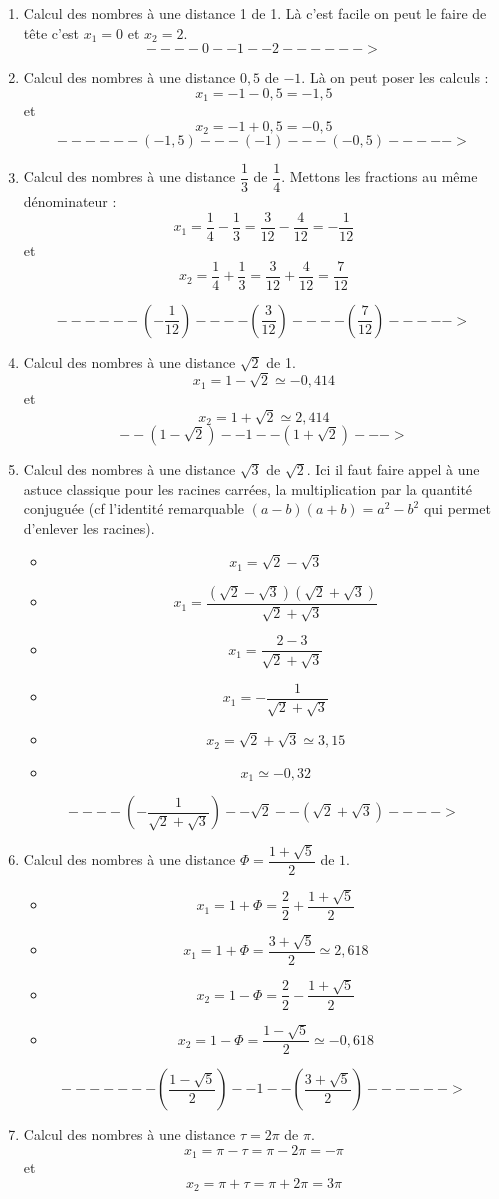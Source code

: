 \documentclass[a4paper,11pt]{book}
\begin{document}
\begin{enumerate}
\item Calcul des nombres à une distance 1 de 1. Là c'est facile on peut
le faire de tête c'est \(x_1 = 0\) et \(x_2 = 2\).
\[----0--1--2------>\]
\item Calcul des nombres à une distance \(0,5\) de \(-1\). Là on peut
poser les calculs :
\[x_1 = -1 - 0,5 = -1,5\]
et
\[x_2 = -1 + 0,5 = -0,5\]
\[------(-1,5)---(-1)---(-0,5)----->\]
\item Calcul des nombres à une distance \(\dfrac{1}{3}\) de
\(\dfrac{1}{4}\). Mettons les fractions au même dénominateur :
\[x_1 = \dfrac{1}{4} - \dfrac{1}{3} = \dfrac{3}{12} - \dfrac{4}{12} =
   -\dfrac{1}{12}\]
et
\[x_2 = \dfrac{1}{4} + \dfrac{1}{3} = \dfrac{3}{12} + \dfrac{4}{12}
   = \dfrac{7}{12}\]

\[------\left(-\dfrac{1}{12}\right)----\left(\dfrac{3}{12}\right)----\left(\dfrac{7}{12}\right)----->\]
\item Calcul des nombres à une distance \(\sqrt{2}\) de 1.
\[x_1 = 1 - \sqrt{2}\simeq -0,414\]
et
\[x_2 = 1 + \sqrt{2} \simeq 2,414\]
\[--(1-\sqrt{2})--1--(1+\sqrt{2})--->\]
\item Calcul des nombres à une distance \(\sqrt{3}\) de \(\sqrt{2}\). Ici
il faut faire appel à une astuce classique pour les racines
carrées, la multiplication par la quantité conjuguée (cf l'identité
remarquable \((a - b)(a + b) = a^2 - b^2\) qui permet d'enlever les
racines).
\begin{itemize}
\item \[x_1 = \sqrt{2} - \sqrt{3} \]
\item \[x_1 = \dfrac{(\sqrt{2} - \sqrt{3})(\sqrt{2} + \sqrt{3})}{\sqrt{2} + \sqrt{3}}\]
\item \[x_1 = \dfrac{2 - 3}{\sqrt{2} + \sqrt{3}}\]
\item \[x_1 = -\dfrac{1}{\sqrt{2} + \sqrt{3}}\]
\item \[x_2 = \sqrt{2} + \sqrt{3}\simeq 3,15\]
\item \[x_1 \simeq -0,32\]
\end{itemize}
\[----\left(-\dfrac{1}{\sqrt{2} + \sqrt{3}}\right)--\sqrt{2}--(\sqrt{2} + \sqrt{3})---->\]
\item Calcul des nombres à une distance \(\Phi = \dfrac{1 +
   \sqrt{5}}{2}\) de \(1\).

\begin{itemize}
\item \[x_1 = 1 + \Phi = \dfrac{2}{2} + \dfrac{1 + \sqrt{5}}{2}\]
\item \[x_1 = 1 + \Phi = \dfrac{3 + \sqrt{5}}{2}\simeq 2,618\]
\item \[x_2 = 1 - \Phi = \dfrac{2}{2} - \dfrac{1 + \sqrt{5}}{2}\]
\item \[x_2 = 1 - \Phi = \dfrac{1 - \sqrt{5}}{2}\simeq -0,618\]
\end{itemize}
\[-------\left(\dfrac{1 - \sqrt{5}}{2}\right)--1--\left(\dfrac{3 + \sqrt{5}}{2}\right)------>\]
\item Calcul des nombres à une distance \(\tau = 2\pi\) de \(\pi\).
\[x_1 = \pi - \tau = \pi - 2\pi = -\pi\]
et \[x_2 = \pi + \tau = \pi + 2\pi = 3\pi\]


\end{enumerate}
\end{document}
